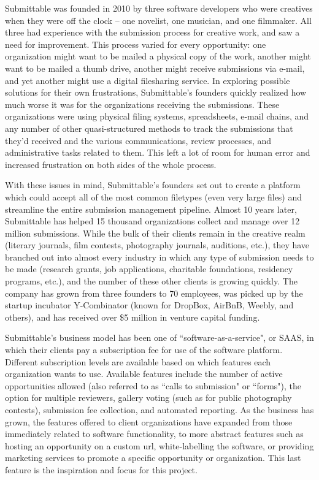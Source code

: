 \documentclass[]{report}   %
\begin{document}
Submittable was founded in 2010 by three software developers who were creatives when they were off the clock -- one novelist, one musician, and one filmmaker. All three had experience with the submission process for creative work, and saw a need for improvement. This process varied for every opportunity: one organization might want to be mailed a physical copy of the work, another might want to be mailed a thumb drive, another might receive submissions via e-mail, and yet another might use a digital filesharing service. In exploring possible solutions for their own frustrations, Submittable's founders quickly realized how much worse it was for the organizations receiving the submissions. These organizations were using physical filing systems, spreadsheets, e-mail chains, and any number of other quasi-structured methods to track the submissions that they'd received and the various communications, review processes, and administrative tasks related to them. This left a lot of room for human error and increased frustration on both sides of the whole process.

With these issues in mind, Submittable's founders set out to create a platform which could accept all of the most common filetypes (even very large files) and streamline the entire submission management pipeline. Almost 10 years later, Submittable has helped 15 thousand organizations collect and manage over 12 million submissions. While the bulk of their clients remain in the creative realm (literary journals, film contests, photography journals, auditions, etc.), they have branched out into almost every industry in which any type of submission needs to be made (research grants, job applications, charitable foundations, residency programs, etc.), and the number of these other clients is growing quickly. The company has grown from three founders to 70 employees, was picked up by the startup incubator Y-Combinator (known for DropBox, AirBnB, Weebly, and others), and has received over \$5 million in venture capital funding. 

Submittable's business model has been one of ``software-as-a-service", or SAAS, in which their clients pay a subscription fee for use of the software platform. Different subscription levels are available based on which features each organization wants to use. Available features include the number of active opportunities allowed (also referred to as ``calls to submission" or ``forms"), the option for multiple reviewers, gallery voting (such as for public photography contests), submission fee collection, and automated reporting. As the business has grown, the features offered to client organizations have expanded from those immediately related to software functionality, to more abstract features such as hosting an opportunity on a custom url, white-labelling the software, or providing marketing services to promote a specific opportunity or organization. This last feature is the inspiration and focus for this project.
\end{document}
